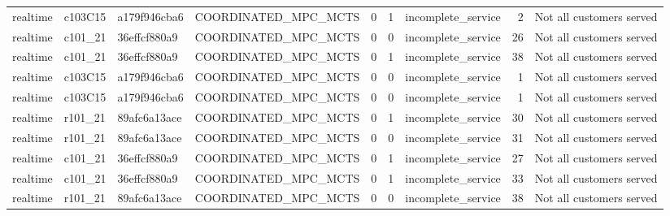 \begin{table}
{\begin{tabular}{llllrrlrl}
realtime & c103C15 & a179f946cba6 & COORDINATED\_MPC\_MCTS & 0 & 1 & incomplete\_service & 2 & Not all customers served \\
realtime & c101\_21 & 36effcf880a9 & COORDINATED\_MPC\_MCTS & 0 & 0 & incomplete\_service & 26 & Not all customers served \\
realtime & c101\_21 & 36effcf880a9 & COORDINATED\_MPC\_MCTS & 0 & 1 & incomplete\_service & 38 & Not all customers served \\
realtime & c103C15 & a179f946cba6 & COORDINATED\_MPC\_MCTS & 0 & 0 & incomplete\_service & 1 & Not all customers served \\
realtime & c103C15 & a179f946cba6 & COORDINATED\_MPC\_MCTS & 0 & 0 & incomplete\_service & 1 & Not all customers served \\
realtime & r101\_21 & 89afc6a13ace & COORDINATED\_MPC\_MCTS & 0 & 1 & incomplete\_service & 30 & Not all customers served \\
realtime & r101\_21 & 89afc6a13ace & COORDINATED\_MPC\_MCTS & 0 & 0 & incomplete\_service & 31 & Not all customers served \\
realtime & c101\_21 & 36effcf880a9 & COORDINATED\_MPC\_MCTS & 0 & 1 & incomplete\_service & 27 & Not all customers served \\
realtime & c101\_21 & 36effcf880a9 & COORDINATED\_MPC\_MCTS & 0 & 1 & incomplete\_service & 33 & Not all customers served \\
realtime & r101\_21 & 89afc6a13ace & COORDINATED\_MPC\_MCTS & 0 & 0 & incomplete\_service & 38 & Not all customers served \\
\bottomrule
\end{tabular}
}
\end{table}
